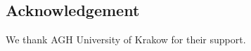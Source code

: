 \documentclass[a4paper]{article}
\begin{document}
\begin{multicols}{2}
\section*{Acknowledgement}
We thank AGH University of Krakow for their support.


\nocite{ChenYao2022,Deloitte2000,Scribbr2020,SlatWorp2019,SlatWorpHolierhoekND,Launiainen2018,Karatas2021,MarahChallenger2023}


\end{multicols}
\end{document}
